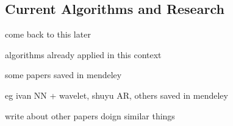     \subsection{Current Algorithms and Research}
    \label{subsec:bg-litreview-currentalgs}
        \begin{sitemize}
            \item{come back to this later}
            \item{algorithms already applied in this context}
            \item{some papers saved in mendeley}
            \item{eg ivan NN + wavelet, shuyu AR, others saved in mendeley}
            \item{write about other papers doign similar things}
        \end{sitemize}
    
